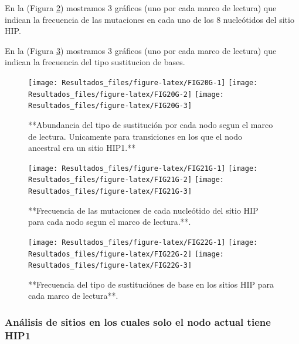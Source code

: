 \documentclass[
]{book}
\begin{document}
En la (Figura \ref{fig:FIG21G}) mostramos 3 gráficos (uno por cada marco de lectura) que indican la frecuencia de las mutaciones en cada uno de los 8 nucleótidos del sitio HIP.

En la (Figura \ref{fig:FIG22G}) mostramos 3 gráficos (uno por cada marco de lectura) que indican la frecuencia del tipo sustitucion de bases.

\begin{figure}

{\centering \texttt{[image: Resultados\_files/figure-latex/FIG20G-1]} \texttt{[image: Resultados\_files/figure-latex/FIG20G-2]} \texttt{[image: Resultados\_files/figure-latex/FIG20G-3]} 

}

\caption{**Abundancia del tipo de sustitución por cada nodo segun el marco de lectura. Unicamente para transiciones en los que el nodo ancestral era un sitio HIP1.**}\label{fig:FIG20G}
\end{figure}

\begin{figure}

{\centering \texttt{[image: Resultados\_files/figure-latex/FIG21G-1]} \texttt{[image: Resultados\_files/figure-latex/FIG21G-2]} \texttt{[image: Resultados\_files/figure-latex/FIG21G-3]} 

}

\caption{**Frecuencia de las mutaciones de cada nucleótido del sitio HIP para cada nodo segun el marco de lectura.**.}\label{fig:FIG21G}
\end{figure}

\begin{figure}

{\centering \texttt{[image: Resultados\_files/figure-latex/FIG22G-1]} \texttt{[image: Resultados\_files/figure-latex/FIG22G-2]} \texttt{[image: Resultados\_files/figure-latex/FIG22G-3]} 

}

\caption{**Frecuencia del tipo de sustituciónes de base en los sitios HIP para cada marco de lectura**.}\label{fig:FIG22G}
\end{figure}

\hypertarget{anuxe1lisis-de-sitios-en-los-cuales-solo-el-nodo-actual-tiene-hip1-2}{%
\subsubsection{Análisis de sitios en los cuales solo el nodo actual tiene HIP1}\label{anuxe1lisis-de-sitios-en-los-cuales-solo-el-nodo-actual-tiene-hip1-2}}
\end{document}
